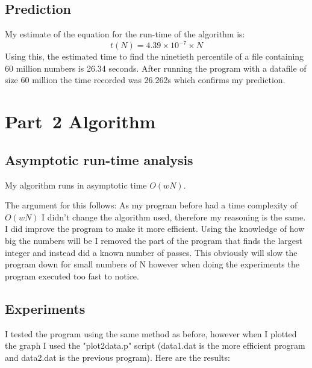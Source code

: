 \documentclass{article}
\begin{document}
\subsection{Prediction}
\label{sec:prediction1}

My estimate of the equation for the run-time of the algorithm is:
\begin{equation}
  \label{eq:estimated_runtime1}
  t(N) = 4.39\times10^{-7}\times N
\end{equation}
Using this, the estimated time to find the ninetieth percentile of a
file containing 60 million numbers is 26.34 seconds. After running the program 
with a datafile of size 60 million the time recorded was 26.262s which confirms
my prediction.


\section{Part~2 Algorithm}
\label{sec:algorithm2}

\subsection{Asymptotic run-time analysis}

My algorithm runs in asymptotic time $O(wN)$. 

The argument for this follows:
As my program before had a time complexity of $O(wN)$ I didn't change the algorithm used, therefore my reasoning is the same. I did improve the program to make it more efficient. Using the knowledge of how big the numbers will be I removed the part of the program that finds the largest integer and instead did a known number of passes. This obviously will slow the program down for small numbers of N however when doing the experiments the program executed too fast to notice.

\subsection{Experiments}
\label{sec:experiments2}
I tested the program using the same method as before, however when I plotted the graph I used the "plot2data.p" script (data1.dat is the more efficient program and data2.dat is the previous program). Here are the results:

\end{document}
